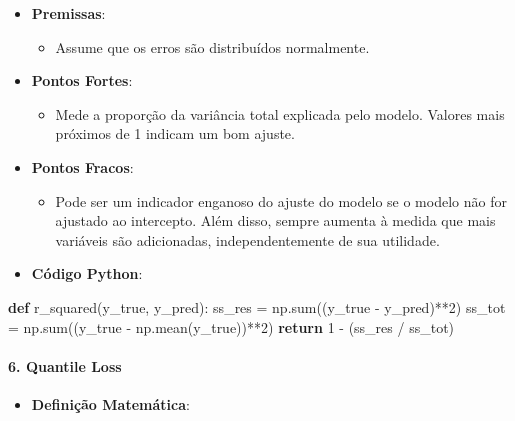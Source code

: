 \documentclass[11pt]{article}
\providecommand{\tightlist}{%
      \setlength{\itemsep}{0pt}\setlength{\parskip}{0pt}}
\newenvironment{Shaded}{}{}
\newcommand{\KeywordTok}[1]{\textcolor[rgb]{0.00,0.44,0.13}{\textbf{{#1}}}}
\newcommand{\DecValTok}[1]{\textcolor[rgb]{0.25,0.63,0.44}{{#1}}}
\newcommand{\NormalTok}[1]{{#1}}
\newcommand{\ControlFlowTok}[1]{\textcolor[rgb]{0.00,0.44,0.13}{\textbf{{#1}}}}
\newcommand{\OperatorTok}[1]{\textcolor[rgb]{0.40,0.40,0.40}{{#1}}}
\newcommand{\BuiltInTok}[1]{{#1}}
\begin{document}
\begin{itemize}
\tightlist
\item
  \textbf{Premissas}:

  \begin{itemize}
  \tightlist
  \item
    Assume que os erros são distribuídos normalmente.
  \end{itemize}
\item
  \textbf{Pontos Fortes}:

  \begin{itemize}
  \tightlist
  \item
    Mede a proporção da variância total explicada pelo modelo. Valores
    mais próximos de 1 indicam um bom ajuste.
  \end{itemize}
\item
  \textbf{Pontos Fracos}:

  \begin{itemize}
  \tightlist
  \item
    Pode ser um indicador enganoso do ajuste do modelo se o modelo não
    for ajustado ao intercepto. Além disso, sempre aumenta à medida que
    mais variáveis são adicionadas, independentemente de sua utilidade.
  \end{itemize}
\item
  \textbf{Código Python}:
\end{itemize}

\begin{Shaded}
\begin{Highlighting}[]
\KeywordTok{def}\NormalTok{ r\_squared(y\_true, y\_pred):}
\NormalTok{    ss\_res }\OperatorTok{=}\NormalTok{ np.}\BuiltInTok{sum}\NormalTok{((y\_true }\OperatorTok{{-}}\NormalTok{ y\_pred)}\OperatorTok{**}\DecValTok{2}\NormalTok{)}
\NormalTok{    ss\_tot }\OperatorTok{=}\NormalTok{ np.}\BuiltInTok{sum}\NormalTok{((y\_true }\OperatorTok{{-}}\NormalTok{ np.mean(y\_true))}\OperatorTok{**}\DecValTok{2}\NormalTok{)}
    \ControlFlowTok{return} \DecValTok{1} \OperatorTok{{-}}\NormalTok{ (ss\_res }\OperatorTok{/}\NormalTok{ ss\_tot)}
\end{Highlighting}
\end{Shaded}

\hypertarget{quantile-loss}{%
\paragraph{6. Quantile Loss}\label{quantile-loss}}

\begin{itemize}
\tightlist
\item
  \textbf{Definição Matemática}:
\end{itemize}
\end{document}
